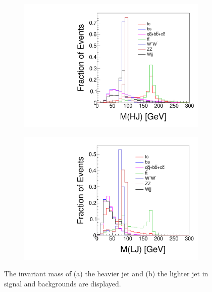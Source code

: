 \documentclass[a4paper,11pt]{article}
\begin{document}
\begin{figure}[htbp]
  \centering
  \captionsetup[sub]{font=large}
  \begin{subfigure}[t]{0.45\textwidth}
     \includegraphics[width=\linewidth]{mj1.pdf}
     \caption{}
     \label{fig:mj1}
  \end{subfigure}
  \begin{subfigure}[t]{0.45\textwidth}
     \includegraphics[width=\linewidth]{mj2.pdf}
     \caption{}
     \label{fig:mj2}
  \end{subfigure}
  \caption{The invariant mass of (a) the heavier jet and (b) the lighter jet in signal and backgrounds are displayed.}\label{fig:mj1mj2}
\end{figure}
\end{document}
